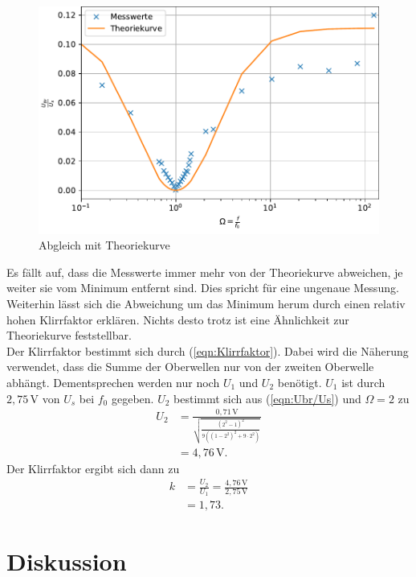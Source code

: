 \documentclass[
  bibliography=totoc,     %
  captions=tableheading,  %
  titlepage=firstiscover, %
]{scrartcl}
\begin{document}
  \begin{figure}
   \centering
    \includegraphics{plot.pdf}
    \caption{Abgleich mit Theoriekurve}
    \label{fig:plot}
  \end{figure}
  \FloatBarrier

  Es fällt auf, dass die Messwerte immer mehr von der Theoriekurve abweichen, je weiter sie vom Minimum entfernt sind. Dies spricht für eine ungenaue Messung.
  Weiterhin lässt sich die Abweichung um das Minimum herum durch einen relativ hohen Klirrfaktor erklären. Nichts desto trotz ist eine Ähnlichkeit zur Theoriekurve
  feststellbar.
  \\
  Der Klirrfaktor bestimmt sich durch (\autoref{eqn:Klirrfaktor}). Dabei wird die Näherung verwendet, dass die Summe der Oberwellen nur von der zweiten Oberwelle abhängt. Dementsprechen werden
  nur noch $U_1$ und $U_2$ benötigt. $U_1$ ist durch $2,75\,\unit{\volt}$ von $U_s$ bei $f_0$ gegeben. $U_2$ bestimmt sich aus (\autoref{eqn:Ubr/Us}) und $\Omega = 2$ zu
  \begin{align*}
    U_2 &= \frac{0,71\,\unit{\volt}}{\sqrt{\frac{(2^2 -1)^2}{9((1-2^2)^2 +9\cdot2^2)}}}\\
  &= 4,76\,\unit{\volt}.
  \end{align*}
  Der Klirrfaktor ergibt sich dann zu
  \begin{align*}
    k &= \frac{U_2}{U_1} = \frac{4,76\,\unit{\volt}}{2,75\,\unit{\volt}} \\
    &= 1,73.
  \end{align*}

  \newpage
  \section{Diskussion}
  \label{sec:Diskussion}
\end{document}
